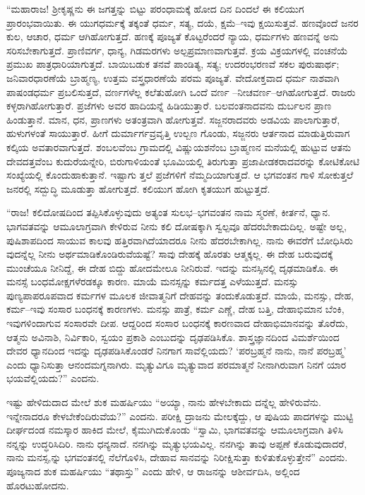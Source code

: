 “ಮಹಾರಾಜ! ಶ್ರೀಕೃಷ್ಣನು ಈ ಜಗತ್ತನ್ನು ಬಿಟ್ಟು ಪರಂಧಾಮಕ್ಕೆ ಹೋದ ದಿನ ದಿಂದಲೆ ಈ ಕಲಿಯುಗ ಪ್ರಾರಂಭವಾಯಿತು. ಈ ಯುಗಧರ್ಮಕ್ಕೆ ತಕ್ಕಂತೆ ಧರ್ಮ, ಸತ್ಯ, ದಯೆ, ಕ್ಷಮೆ–ಇವು ಕ್ಷಯಿಸುತ್ತವೆ. ಹಣವೊಂದೆ ಜನರ ಕುಲ, ಆಚಾರ, ಧರ್ಮ ಆಗಿಹೋಗುತ್ತದೆ. ಹಣಕ್ಕೆ ಪೂಜ್ಯತೆ ಕೊಟ್ಟರೆಂದರೆ ನ್ಯಾಯ, ಧರ್ಮಗಳು ಹಣವನ್ನೆ ಅನು ಸರಿಸಬೇಕಾಗುತ್ತದೆ. ಪ್ರಾಣಿವರ್ಗ, ಧಾನ್ಯ, ಗಿಡಮರಗಳು ಅಲ್ಪಪ್ರಮಾಣವಾಗುತ್ತವೆ. ಕ್ರಯ ವಿಕ್ರಯಗಳಲ್ಲಿ ವಂಚನೆಯೆ ಪ್ರಮುಖ ಪಾತ್ರಧಾರಿಯಾಗುತ್ತದೆ. ಬಾಯಿಬಡುಕ ತನವೆ ಪಾಂಡಿತ್ಯ, ಸತ್ಯ; ಉದರಂಭರಣವೆ ಸಕಲ ಪುರುಷಾರ್ಥ; ಜನಿವಾರಧಾರಣೆಯೆ ಬ್ರಾಹ್ಮಣ್ಯ, ಉತ್ತಮ ವಸ್ತ್ರಧಾರಣೆಯೆ ಪರಮ ಪೂಜ್ಯತೆ. ವೇದೋಕ್ತವಾದ ಧರ್ಮ ನಾಶವಾಗಿ ಪಾಷಂಡಧರ್ಮ ಪ್ರಬಲಿಸುತ್ತದೆ, ವರ್ಣಗಳೆಲ್ಲ ಕಲೆತುಹೋಗಿ ಒಂದೆ ವರ್ಣ –ನೀಚವರ್ಣ–ಆಗಿಹೋಗುತ್ತದೆ. ರಾಜರು ಕಳ್ಳರಾಗಿಹೋಗುತ್ತಾರೆ. ಪ್ರಜೆಗಳು ಅವರ ಹಾದಿಯನ್ನೆ ಹಿಡಿಯುತ್ತಾರೆ. ಬಲವಂತನಾದವನು ದುರ್ಬಲನ ಪ್ರಾಣ ಹಿಂಡುತ್ತಾನೆ. ಮಾನ, ಧನ, ಪ್ರಾಣಗಳು ಅತಂತ್ರವಾಗಿ ಹೋಗುತ್ತವೆ. ಸಜ್ಜನರಾದವರು ಅಡವಿಯ ಪಾಲಾಗುತ್ತಾರೆ, ಹುಳುಗಳಂತೆ ಸಾಯುತ್ತಾರೆ. ಹೀಗೆ ದುರ್ಮಾರ್ಗವ್ರವೃತ್ತಿ ಉಲ್ಬಣ ಗೊಂಡು, ಸಜ್ಜನರು ಆರ್ತನಾದ ಮಾಡುತ್ತಿರುವಾಗ ಕಲ್ಕಿಯ ಅವತಾರವಾಗುತ್ತದೆ. ಶಂಬಲವೆಂಬ ಗ್ರಾಮದಲ್ಲಿ ವಿಷ್ಣುಯಶನೆಂಬ ಬ್ರಾಹ್ಮಣನ ಮನೆಯಲ್ಲಿ ಹುಟ್ಟುವ ಆತನು ದೇವದತ್ತವೆಂಬ ಕುದುರೆಯನ್ನೇರಿ, ಬಿರುಗಾಳಿಯಂತೆ ಭೂಮಿಯಲ್ಲಿ ತಿರುಗುತ್ತಾ ಪ್ರಜಾಪೀಡಕರಾದವರನ್ನು ಕೋಟಿಕೋಟಿ ಸಂಖ್ಯೆಯಲ್ಲಿ ಕೊಂದುಹಾಕುತ್ತಾನೆ. ಇಷ್ಟಾಗು ತ್ತಲೆ ಪ್ರಜೆಗಳಿಗೆ ನೆಮ್ಮದಿಯಾಗುತ್ತದೆ. ಆ ಭಗವಂತನ ಗಾಳಿ ಸೋಕುತ್ತಲೆ ಜನರಲ್ಲಿ ಸದ್ಬುದ್ಧಿ ಮೂಡುತ್ತಾ ಹೋಗುತ್ತದೆ. ಕಲಿಯುಗ ಹೋಗಿ ಕೃತಯುಗ ಹುಟ್ಟುತ್ತದೆ.

“ರಾಜ! ಕಲಿದೋಷದಿಂದ ತಪ್ಪಿಸಿಕೊಳ್ಳುವುದು ಅತ್ಯಂತ ಸುಲಭ–ಭಗವಂತನ ನಾಮ ಸ್ಮರಣೆ, ಕೀರ್ತನೆ, ಧ್ಯಾನ. ಭಾಗವತವನ್ನು ಆಮೂಲಾಗ್ರವಾಗಿ ಕೇಳಿರುವ ನೀನು ಕಲಿ ದೋಷಕ್ಕಾಗಿ ಸ್ವಲ್ಪವೂ ಹೆದರಬೇಕಾದುದಿಲ್ಲ. ಅಷ್ಟೇ ಅಲ್ಲ, ಪುಷಿಶಾಪದಿಂದ ಸಾಯುವ ಕಾಲವು ಹತ್ತಿರವಾಗಿದೆಯಾದರೂ ನೀನು ಹೆದರಬೇಕಾಗಿಲ್ಲ. ನಾನು ಈವರೆಗೆ ಬೋಧಿಸಿರು ವುದನ್ನೆಲ್ಲ ನೀನು ಅರ್ಥಮಾಡಿಕೊಂಡಿರುವೆಯಷ್ಟೆ? ಸಾವು ದೇಹಕ್ಕೆ ಹೊರತು ಆತ್ಮಕ್ಕಲ್ಲ. ಈ ದೇಹ ಬರುವುದಕ್ಕೆ ಮುಂಚೆಯೂ ನೀನಿದ್ದೆ, ಈ ದೇಹ ಬಿದ್ದು ಹೋದಮೇಲೂ ನೀನಿರುವೆ. ಇದನ್ನು ಮನಸ್ಸಿನಲ್ಲಿ ದೃಢಮಾಡಿಕೊ. ಈ ಮನಸ್ಸೆ ಬಂಧಮೋಕ್ಷಗಳೆರಡಕ್ಕೂ ಕಾರಣ. ಮಾಯೆ ಮನಸ್ಸನ್ನು ಕರ್ಮದತ್ತ ಎಳೆಯುತ್ತದೆ. ಮನಸ್ಸು ಪುಣ್ಯಪಾಪರೂಪವಾದ ಕರ್ಮಗಳ ಮೂಲಕ ಜೀವಾತ್ಮನಿಗೆ ದೇಹವನ್ನು ತಂದುಕೊಡುತ್ತದೆ. ಮಾಯೆ, ಮನಸ್ಸು, ದೇಹ, ಕರ್ಮ–ಇವು ಸಂಸಾರ ಬಂಧನಕ್ಕೆ ಕಾರಣಗಳು. ಮನಸ್ಸು ಪಾತ್ರೆ, ಕರ್ಮ ಎಣ್ಣೆ, ದೇಹ ಬತ್ತಿ, ದೇಹಾಭಿಮಾನ ಬೆಂಕಿ, ಇವುಗಳಿಂದಾಗುವ ಸಂಸಾರವೇ ದೀಪ. ಆದ್ದರಿಂದ ಸಂಸಾರ ಬಂಧನಕ್ಕೆ ಕಾರಣವಾದ ದೇಹಾಭಿಮಾನವನ್ನು ತೊರೆದು, ಆತ್ಮನು ಅವಿನಾಶಿ, ನಿರ್ವಿಕಾರಿ, ಸ್ವಯಂ ಪ್ರಕಾಶಿ ಎಂಬುದನ್ನು ದೃಢಪಡಿಸಿಕೊ. ಶಾಸ್ತ್ರಜ್ಞಾನದಿಂದ ವಿಮರ್ಶೆಯಿಂದ ದೇವರ ಧ್ಯಾನದಿಂದ ಇದನ್ನು ದೃಢಪಡಿಸಿಕೊಂಡರೆ ನಿನಗಾಗ ಸಾವೆಲ್ಲಿಯದು? ‘ಪರಬ್ರಹ್ಮನೆ ನಾನು, ನಾನೆ ಪರಬ್ರಹ್ಮ’ ಎಂದು ಧ್ಯಾನಿಸುತ್ತಾ ಆನಂದಮಗ್ನನಾಗಿರು. ಮೃತ್ಯುವಿಗೂ ಮೃತ್ಯುವಾದ ಪರಮಾತ್ಮನೆ ನೀನಾಗಿರುವಾಗ ನಿನಗೆ ಯಾರ ಭಯವೆಲ್ಲಿಯದು?” ಎಂದನು.

ಇಷ್ಟು ಹೇಳಿದುದಾದ ಮೇಲೆ ಶುಕ ಮಹರ್ಷಿಯು “ಅಯ್ಯಾ, ನಾನು ಹೇಳಬೇಕಾದು ದನ್ನೆಲ್ಲ ಹೇಳಿರುವೆನು. ಇನ್ನೇನಾದರೂ ಕೇಳಬೇಕೆಂದಿರುವೆಯ?” ಎಂದನು. ಪರೀಕ್ಷಿ ದ್ರಾಜನು ಮೇಲಕ್ಕೆದ್ದು, ಆ ಪುಷಿಯ ಪಾದಗಳನ್ನು ಮುಟ್ಟಿ ದೀರ್ಘದಂಡ ನಮಸ್ಕಾರ ಹಾಕಿದ ಮೇಲೆ, ಕೈಮುಗಿದುಕೊಂಡು “ಸ್ವಾಮಿ, ಭಾಗವತವನ್ನು ಆಮೂಲಾಗ್ರವಾಗಿ ತಿಳಿಸಿ ನನ್ನನ್ನು ಉದ್ಧರಿಸಿದಿರಿ. ನಾನು ಧನ್ಯನಾದೆ. ನನಗಿನ್ನು ಮೃತ್ಯುಭಯವಿಲ್ಲ. ನನಗಿನ್ನು ತಾವು ಅಪ್ಪಣೆ ಕೊಡುವುದಾದರೆ, ನಾನು ಮನಸ್ಸ,ನ್ನು ಭಗವಂತನಲ್ಲಿ ನೆಲೆಗೊಳಿಸಿ, ದೇಹಾವ ಸಾನವನ್ನು ನಿರೀಕ್ಷಿಸುತ್ತಾ ಕುಳಿತುಕೊಳ್ಳುತ್ತೇನೆ” ಎಂದನು. ಪೂಜ್ಯನಾದ ಶುಕ ಮಹರ್ಷಿಯು “ತಥಾಸ್ತು” ಎಂದು ಹೇಳಿ, ಆ ರಾಜನನ್ನು ಆಶೀರ್ವದಿಸಿ, ಅಲ್ಲಿಂದ ಹೊರಟುಹೋದನು.

